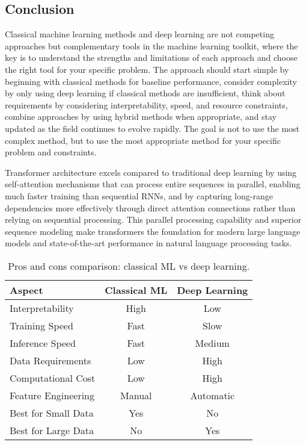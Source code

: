 \subsection{Conclusion}

Classical machine learning methods and deep learning are not competing approaches but complementary tools in the machine learning toolkit, where the key is to understand the strengths and limitations of each approach and choose the right tool for your specific problem. The approach should start simple by beginning with classical methods for baseline performance, consider complexity by only using deep learning if classical methods are insufficient, think about requirements by considering interpretability, speed, and resource constraints, combine approaches by using hybrid methods when appropriate, and stay updated as the field continues to evolve rapidly. The goal is not to use the most complex method, but to use the most appropriate method for your specific problem and constraints.

\begin{remark}
Transformer architecture excels compared to traditional deep learning by using self-attention mechanisms that can process entire sequences in parallel, enabling much faster training than sequential RNNs, and by capturing long-range dependencies more effectively through direct attention connections rather than relying on sequential processing. This parallel processing capability and superior sequence modeling make transformers the foundation for modern large language models and state-of-the-art performance in natural language processing tasks.
\end{remark}

\begin{table}[htbp]
\centering
\begin{tabular}{lcc}
\toprule
Aspect & Classical ML & Deep Learning \\
\midrule
Interpretability & High & Low \\
Training Speed & Fast & Slow \\
Inference Speed & Fast & Medium \\
Data Requirements & Low & High \\
Computational Cost & Low & High \\
Feature Engineering & Manual & Automatic \\
Best for Small Data & Yes & No \\
Best for Large Data & No & Yes \\
\bottomrule
\end{tabular}
\caption{Pros and cons comparison: classical ML vs deep learning.}
\label{tab:ml-dl-pros-cons}
\end{table}
